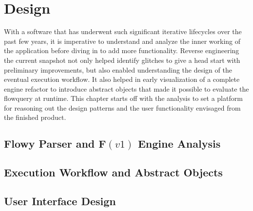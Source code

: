 \chapter{Design}\label{ch:design}

With a software that has underwent such significant iterative lifecycles over
the past few years, it is imperative to understand and analyze the inner
working of the application before diving in to add more functionality. Reverse
engineering the current snapshot not only helped identify glitches to give a
head start with preliminary improvements, but also enabled understanding the
design of the eventual execution workflow. It also helped in early
visualization of a complete engine refactor to introduce abstract objects that
made it possible to evaluate the flowquery at runtime. This chapter starts off
with the analysis to set a platform for reasoning out the design patterns and
the user functionality envisaged from the finished product.

\section{Flowy Parser and F$(v1)$ Engine Analysis}\label{sec:adt-workflow}


\section{Execution Workflow and Abstract Objects}\label{sec:adt-workflow}


\section{User Interface Design}\label{sec:engine-interface}

